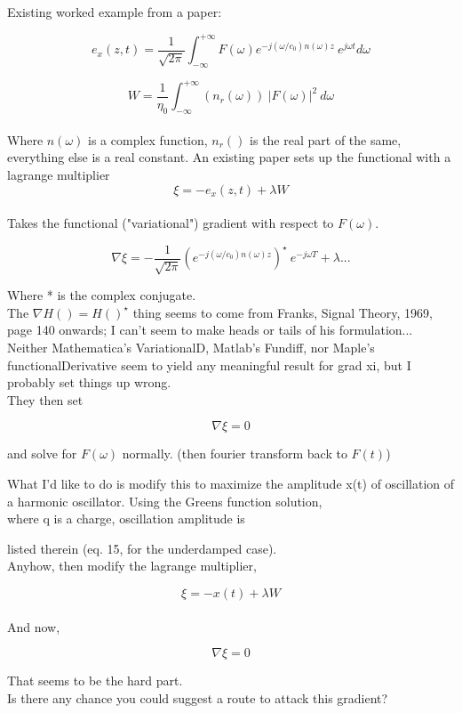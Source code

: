 \documentclass[]{article}
\begin{document}
Existing worked example from a paper:

$$ e_x(z,t) = \frac{1}{\sqrt{2 \pi}} \int_{-\infty}^{+\infty}{F(\omega) e^{- j (\omega/c_0)n(\omega)z}\ e^{j\omega t} d\omega} $$

$$W = \frac{1}{\eta_0} \int_{-\infty}^{+\infty}{(n_r(\omega))\ |F(\omega)|^2}\ d\omega$$\\

Where $n(\omega)$ is a complex function, $n_r()$ is the real part of the same, everything else is a real constant. An existing paper sets up the functional with a lagrange multiplier\\

$$\xi = -e_x(z,t) + \lambda W$$\\

Takes the functional ("variational") gradient with respect to $F(\omega)$.

$$ \nabla \xi = -\frac{1}{\sqrt{2\pi}} \left(e^{- j (\omega/c_0)n(\omega)z}\right)^\star \  e^{-j\omega T} + \lambda...$$

Where * is the complex conjugate.\\

The $\nabla H() = H()^\star$ thing seems to come from Franks, Signal Theory, 1969, page 140 onwards; I can't seem to make heads or tails of his formulation... \\

Neither Mathematica's VariationalD, Matlab's Fundiff, nor Maple's functionalDerivative seem to yield any meaningful result for grad xi, but I probably set things up wrong.\\

They then set

$$\nabla \xi = 0$$

and solve for $F(\omega)$ normally. (then fourier transform back to $F(t)$)\\

\pagebreak

What I'd like to do is modify this to maximize the amplitude x(t) of oscillation of a harmonic oscillator. Using the Greens function solution, \\

where q is a charge, oscillation amplitude is


listed therein (eq. 15, for the underdamped case).\\

Anyhow, then modify the lagrange multiplier,

$$\xi = -x(t) + \lambda W$$\\

And now,

$$\nabla \xi = 0$$

That seems to be the hard part.\\

Is there any chance you could suggest a route to attack this gradient?
\end{document}
